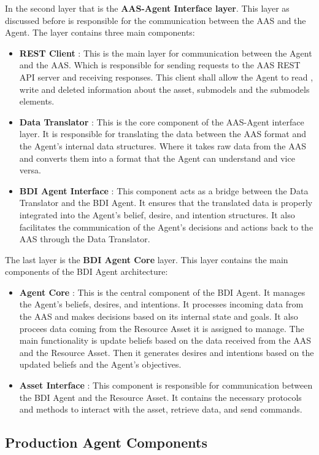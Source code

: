 In the second layer that is the \textbf{AAS-Agent Interface layer}.
This layer as discussed before is responsible for the communication between the AAS and the Agent.
The layer contains three main components:
\begin{itemize}
  \item \textbf{REST Client} : This is the main layer for communication between the Agent and the AAS.
  Which is responsible for sending requests to the AAS REST API server and receiving responses.
  This client shall allow the Agent to read , write and deleted information about the asset, submodels and the submodels elements.
  \item \textbf{Data Translator} : This is the core component of the AAS-Agent interface layer.
  It is responsible for translating the data between the AAS format and the Agent's internal data structures.
  Where it takes raw data from the AAS and converts them into a format that the Agent can understand and vice versa.
  \item \textbf{BDI Agent Interface }: This component acts as a bridge between the Data Translator and the BDI Agent.
  It ensures that the translated data is properly integrated into the Agent's belief, desire, and intention structures.
  It also facilitates the communication of the Agent's decisions and actions back to the AAS through the Data Translator.
\end{itemize}
The last layer is the \textbf{BDI Agent Core} layer.
This layer contains the main components of the BDI Agent architecture:
\begin{itemize}
  \item \textbf{Agent Core} : This is the central component of the BDI Agent.
  It manages the Agent's beliefs, desires, and intentions.
  It processes incoming data from the AAS and makes decisions based on its internal state and goals.
  It also procees data coming from the Resource Asset it is assigned to manage.
  The main functionality is update beliefs based on the data received from the AAS and the Resource Asset.
  Then it generates desires and intentions based on the updated beliefs and the Agent's objectives.
  \item \textbf{Asset Interface} : This component is responsible for communication between the BDI Agent and the Resource Asset.
  It contains the necessary protocols and methods to interact with the asset, retrieve data, and send commands.
\end{itemize}

\newpage
\subsection{Production Agent Components}

